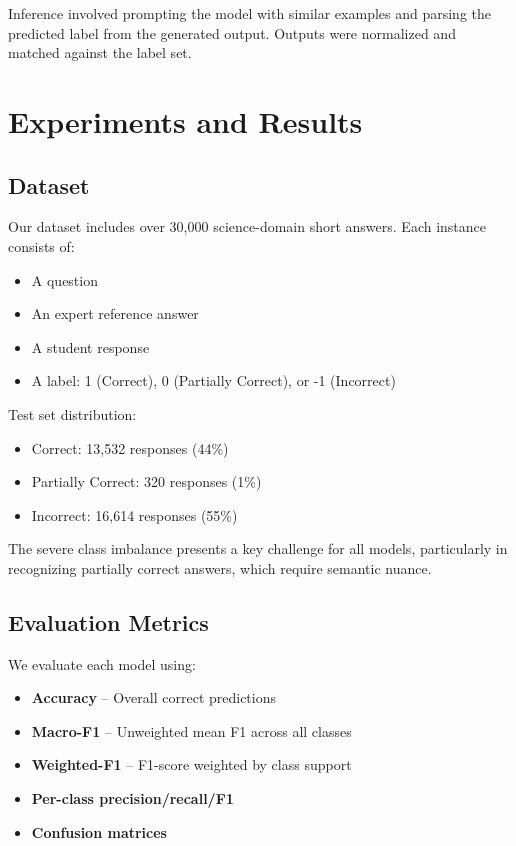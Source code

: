 \documentclass[11pt]{article}
\begin{document}
Inference involved prompting the model with similar examples and parsing the predicted label from the generated output. Outputs were normalized and matched against the label set.

\section{Experiments and Results}
\subsection{Dataset}
Our dataset includes over 30,000 science-domain short answers. Each instance consists of:
\begin{itemize}
    \item A question
    \item An expert reference answer
    \item A student response
    \item A label: 1 (Correct), 0 (Partially Correct), or -1 (Incorrect)
\end{itemize}

Test set distribution:
\begin{itemize}
    \item Correct: 13,532 responses (44\%)
    \item Partially Correct: 320 responses (1\%)
    \item Incorrect: 16,614 responses (55\%)
\end{itemize}

The severe class imbalance presents a key challenge for all models, particularly in recognizing partially correct answers, which require semantic nuance.

\subsection{Evaluation Metrics}
We evaluate each model using:
\begin{itemize}
    \item \textbf{Accuracy} – Overall correct predictions
    \item \textbf{Macro-F1} – Unweighted mean F1 across all classes
    \item \textbf{Weighted-F1} – F1-score weighted by class support
    \item \textbf{Per-class precision/recall/F1}
    \item \textbf{Confusion matrices}
\end{itemize}
\end{document}
